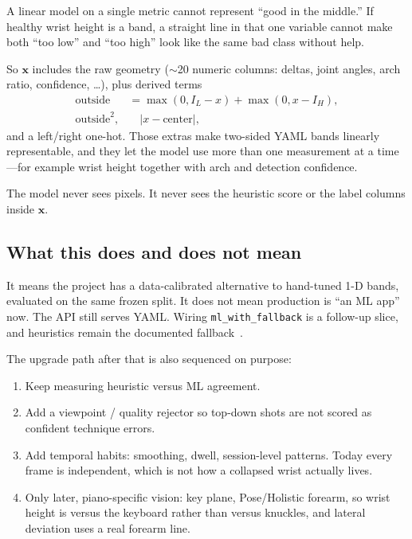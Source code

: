 \documentclass[11pt,a4paper]{article}
\newcommand{\code}[1]{\texttt{#1}}
\begin{document}
A linear model on a single metric cannot represent \enquote{good in the middle.}
If healthy wrist height is a band, a straight line in that one variable cannot make both \enquote{too low} and \enquote{too high} look like the same bad class without help.

So \(\mathbf{x}\) includes the raw geometry (\(\sim\)20 numeric columns: deltas, joint angles, arch ratio, confidence, \ldots), plus derived terms
\begin{align}
  \text{outside} &= \max(0, I_L-x) + \max(0, x-I_H), \\
  \text{outside}^2, &\quad \lvert x - \text{center}\rvert,
\end{align}
and a left/right one-hot.
Those extras make two-sided YAML bands linearly representable, and they let the model use more than one measurement at a time---for example wrist height together with arch and detection confidence.

The model never sees pixels.
It never sees the heuristic score or the label columns inside \(\mathbf{x}\).

\subsection{What this does and does not mean}

It means the project has a data-calibrated alternative to hand-tuned 1-D bands, evaluated on the same frozen split.
It does not mean production is \enquote{an ML app} now.
The API still serves YAML.
Wiring \code{ml\_with\_fallback} is a follow-up slice, and heuristics remain the documented fallback~\cite{prd,mlupgrade}.

The upgrade path after that is also sequenced on purpose:

\begin{enumerate}
  \item Keep measuring heuristic versus ML agreement.
  \item Add a viewpoint / quality rejector so top-down shots are not scored as confident technique errors.
  \item Add temporal habits: smoothing, dwell, session-level patterns. Today every frame is independent, which is not how a collapsed wrist actually lives.
  \item Only later, piano-specific vision: key plane, Pose/Holistic forearm, so wrist height is versus the keyboard rather than versus knuckles, and lateral deviation uses a real forearm line.
\end{enumerate}
\end{document}
